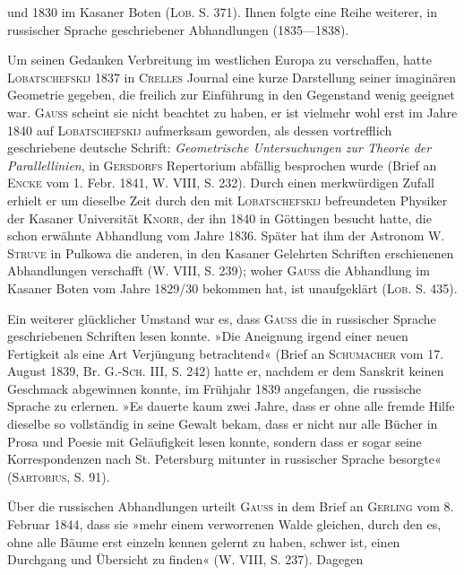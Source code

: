 und 1830 im Kasaner Boten (\textsc{Lob.} S. 371). Ihnen folgte eine Reihe weiterer,
in russischer Sprache geschriebener Abhandlungen (1835—1838).
\par
Um seinen Gedanken Verbreitung im westlichen Europa zu verschaffen,
hatte \textsc{Lobatschefskij} 1837 in \textsc{Crelles} Journal eine kurze Darstellung seiner
imaginären Geometrie gegeben, die freilich zur Einführung in den Gegenstand
wenig geeignet war. \textsc{Gauss} scheint sie nicht beachtet zu haben, er ist vielmehr
wohl erst im Jahre 1840 auf \textsc{Lobatschefskij} aufmerksam geworden, als
dessen vortrefflich geschriebene deutsche Schrift: \textit{Geometrische Untersuchungen
zur Theorie der Parallellinien}, in \textsc{Gersdorfs} Repertorium abfällig besprochen
wurde (Brief an \textsc{Encke} vom 1. Febr. 1841, W. VIII, S. 232). Durch einen
merkwürdigen Zufall erhielt er um dieselbe Zeit durch den mit \textsc{Lobatschefskij}
befreundeten Physiker der Kasaner Universität \textsc{Knorr}, der ihn 1840 in Göttingen
besucht hatte, die schon erwähnte Abhandlung vom Jahre 1836. Später
hat ihm der Astronom W. \textsc{Struve} in Pulkowa die anderen, in den Kasaner
Gelehrten Schriften erschienenen Abhandlungen verschafft (W. VIII, S. 239);
woher \textsc{Gauss} die Abhandlung im Kasaner Boten vom Jahre 1829/30 bekommen
hat, ist unaufgeklärt (\textsc{Lob.} S. 435).
\par
Ein weiterer glücklicher Umstand war es, dass \textsc{Gauss} die in russischer
Sprache geschriebenen Schriften lesen konnte. »Die Aneignung irgend einer
neuen Fertigkeit als eine Art Verjüngung betrachtend« (Brief an \textsc{Schumacher}
vom 17. August 1839, Br. G.-\textsc{Sch.} III, S. 242) hatte er, nachdem er dem
Sanskrit keinen Geschmack abgewinnen konnte, im Frühjahr 1839 angefangen,
die russische Sprache zu erlernen. »Es dauerte kaum zwei Jahre, dass er ohne
\clearpage{}\setcounter{footnote}{0}
\noindent alle fremde Hilfe dieselbe so vollständig in seine Gewalt bekam, dass er nicht
nur alle Bücher in Prosa und Poesie mit Geläufigkeit lesen konnte, sondern
dass er sogar seine Korrespondenzen nach St. Petersburg mitunter in russischer
Sprache besorgte« (\textsc{Sartorius}, S. 91).
\par
Über die russischen Abhandlungen urteilt \textsc{Gauss} in dem Brief an \textsc{Gerling}
vom 8. Februar 1844, dass sie »mehr einem verworrenen Walde gleichen,
durch den es, ohne alle Bäume erst einzeln kennen gelernt zu haben, schwer
ist, einen Durchgang und Übersicht zu finden« (W. VIII, S. 237). Dagegen
